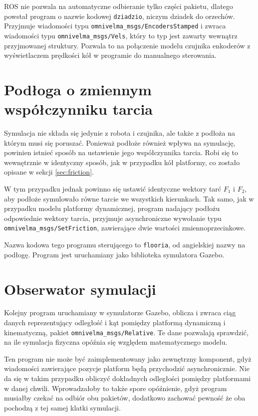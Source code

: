	ROS nie pozwala na automatyczne odbieranie tylko części pakietu, dlatego powstał program o nazwie kodowej \texttt{dziadzio}, niczym dziadek do orzechów.
	Przyjmuje wiadomości typu \texttt{omnivelma\_msgs/EncodersStamped} i zwraca wiadomości typu \texttt{omnivelma\_msgs/Vels}, który to typ 
	jest zawarty wewnątrz przyjmowanej struktury. Pozwala to na połączenie modelu czujnika enkoderów z wyświetlaczem prędkości kół w programie do manualnego sterowania.

\section{Podłoga o zmiennym współczynniku tarcia}
	\label{sec:flooria}
	Symulacja nie składa się jedynie z robota i czujnika, ale także z podłoża na którym musi się poruszać.
	Ponieważ podłoże również wpływa na symulację, powinien istnieć sposób na ustawienie jego współczynnika tarcia.
	Robi się to wewnętrznie w identyczny sposób, jak w przypadku kół platformy, co zostało opisane w sekcji \ref{sec:friction}.
	
	W tym przypadku jednak powinno się ustawić identyczne wektory tarć $F_1$ i $F_2$, aby podłoże symulowało równe tarcie we wszystkich kierunkach.
	Tak samo, jak w przypadku modelu platformy dynamicznej, program nadający podłożu odpowiednie wektory tarcia, przyjmuje asynchroniczne wywołanie 
	typu \texttt{omnivelma\_msgs/SetFriction}, zawierające dwie wartości zmiennoprzecinkowe.
	
	Nazwa kodowa tego programu sterującego to \texttt{flooria}, od angielskiej nazwy na podłogę.
	Program jest uruchamiany jako biblioteka symulatora Gazebo.
	
\section{Obserwator symulacji}
	\label{sec:ocznica}
	Kolejny program uruchamiany w symulatorze Gazebo, oblicza i zwraca ciąg danych reprezentujący 
	odległość i kąt pomiędzy platformą dynamiczną i kinematyczną, pakiet \texttt{omnivelma\_msgs/Relative}.
	Te dane pozwalają sprawdzić, na ile symulacja fizyczna opóźnia się względem matematycznego modelu.
	
	Ten program nie może być zaimplementowany jako zewnętrzny komponent, gdyż wiadomości zawierające pozycje platform będą przychodzić asynchronicznie.
	Nie da się w takim przypadku obliczyć dokładnych odległości pomiędzy platformami w danej chwili. 
	Wprowadzałoby to także spore opóźnienie, gdyż program musiałby czekać na odbiór obu pakietów, dodatkowo zachować pewność że oba pochodzą z tej samej klatki symulacji.
	
